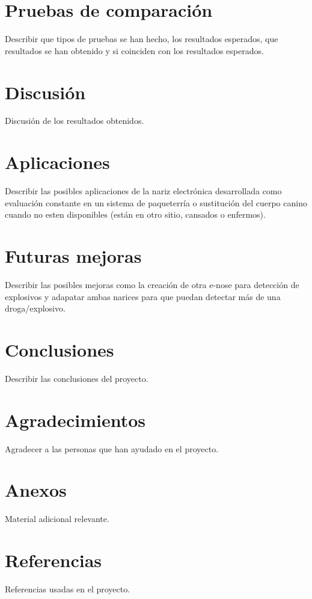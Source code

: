 \documentclass[12pt,a4paper,oneside]{report}
\begin{document}
\section{Pruebas de comparación}
Describir que tipos de pruebas se han hecho, los resultados esperados, que resultados se han obtenido y si coinciden con los resultados esperados.

\section{Discusión}
Discusión de los resultados obtenidos.

\section{Aplicaciones}
Describir las posibles aplicaciones de la nariz electrónica desarrollada como evaluación constante en un sistema de paqueterría o sustitución del cuerpo canino cuando no esten disponibles (están en otro sitio, cansados o enfermos).

\section{Futuras mejoras}
Describir las posibles mejoras como la creación de otra e-nose para detección de explosivos y adapatar ambas narices para que puedan detectar más de una droga/explosivo.

\section{Conclusiones}
Describir las conclusiones del proyecto.

\section{Agradecimientos}
Agradecer a las personas que han ayudado en el proyecto.

\section{Anexos}
Material adicional relevante.

\section{Referencias}
Referencias usadas en el proyecto.
\end{document}
